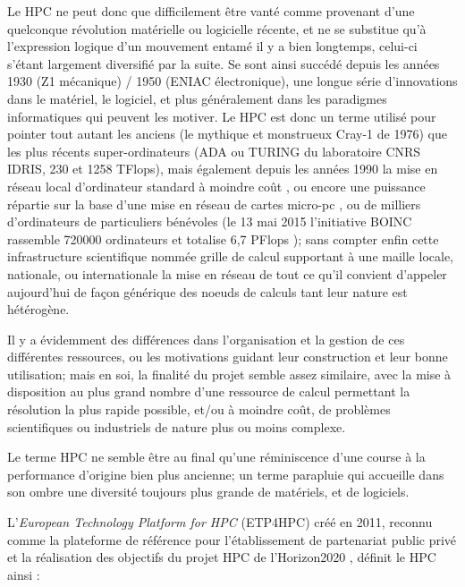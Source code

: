 Le HPC ne peut donc que difficilement être vanté comme provenant d'une quelconque révolution matérielle ou logicielle récente, et ne se substitue qu'à l'expression logique d'un mouvement entamé il y a bien longtemps, celui-ci s'étant largement diversifié par la suite. Se sont ainsi succédé depuis les années 1930 (Z1 mécanique) / 1950 (ENIAC électronique), une longue série d'innovations dans le matériel, le logiciel, et plus généralement dans les paradigmes informatiques qui peuvent les motiver. Le HPC est donc un terme utilisé pour pointer tout autant les anciens (le mythique et monstrueux Cray-1 de 1976) que les plus récents super-ordinateurs (ADA ou TURING du laboratoire CNRS IDRIS, 230 et 1258 TFlops), mais également depuis les années 1990 la mise en réseau local d'ordinateur standard à moindre coût , ou encore une puissance répartie sur la base d'une mise en réseau de cartes micro-pc , ou de milliers d'ordinateurs de particuliers bénévoles (le 13 mai 2015 l'initiative BOINC rassemble 720000 ordinateurs et totalise 6,7 PFlops ); sans compter enfin cette infrastructure scientifique nommée grille de calcul supportant à une maille locale, nationale, ou internationale la mise en réseau de tout ce qu'il convient d'appeler aujourd'hui de façon générique des noeuds de calculs tant leur nature est hétérogène.

Il y a évidemment des différences dans l'organisation et la gestion de ces différentes ressources, ou les motivations guidant leur construction et leur bonne utilisation; mais en soi, la finalité du projet semble assez similaire, avec la mise à disposition au plus grand nombre d'une ressource de calcul permettant la résolution la plus rapide possible, et/ou à moindre coût, de problèmes scientifiques ou industriels de nature plus ou moins complexe.

Le terme HPC ne semble être au final qu'une réminiscence d'une course à la performance d'origine bien plus ancienne; un terme parapluie qui accueille dans son ombre une diversité toujours plus grande de matériels, et de logiciels.

L'\textit{European Technology Platform for HPC} (ETP4HPC) créé en 2011, reconnu comme la plateforme de référence pour l'établissement de partenariat public privé et la réalisation des objectifs du projet HPC de l'Horizon2020 \autocite{ETP4HPC2013}, définit le HPC ainsi :

